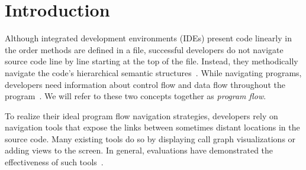 \documentclass[conference]{IEEEtran}
\begin{document}



\IEEEpeerreviewmaketitle


\section{Introduction}
%

Although integrated development environments (IDEs) present code linearly in the order methods are defined in a file, successful developers do not navigate source code line by line starting at the top of the file. 
Instead, they methodically navigate the code's hierarchical semantic structures~\cite{robillard2004investigate}.
While navigating programs, developers need information about control flow and data flow throughout the program~\cite{latoza2010hard, Smith2015}. 
We will refer to these two concepts together as \textit{program flow}. 

To realize their ideal program flow navigation strategies, developers rely on navigation tools that expose the links between sometimes distant locations in the source code. 
Many existing tools do so by displaying call graph visualizations or adding views to the screen.
In general, evaluations have demonstrated the effectiveness of such tools~\cite{Reacher,Whyline,Relo,Stacksplorer}.
\end{document}
